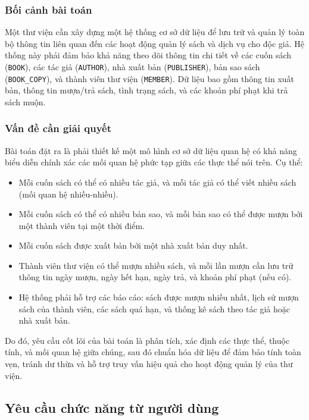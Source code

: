\documentclass[12pt,a4paper]{article}
\newcommand{\entity}[1]{\texttt{#1}}
\begin{document}
\subsubsection{Bối cảnh bài toán}

Một thư viện cần xây dựng một hệ thống cơ sở dữ liệu để lưu trữ và quản lý toàn bộ thông tin liên quan đến các hoạt động quản lý sách và dịch vụ cho độc giả. Hệ thống này phải đảm bảo khả năng theo dõi thông tin chi tiết về các cuốn sách (\entity{BOOK}), các tác giả (\entity{AUTHOR}), nhà xuất bản (\entity{PUBLISHER}), bản sao sách (\entity{BOOK\_COPY}), và thành viên thư viện (\entity{MEMBER}). Dữ liệu bao gồm thông tin xuất bản, thông tin mượn/trả sách, tình trạng sách, và các khoản phí phạt khi trả sách muộn.

\subsubsection{Vấn đề cần giải quyết}

Bài toán đặt ra là phải thiết kế một mô hình cơ sở dữ liệu quan hệ có khả năng biểu diễn chính xác các mối quan hệ phức tạp giữa các thực thể nói trên. Cụ thể:

\begin{itemize}
    \item Mỗi cuốn sách có thể có nhiều tác giả, và mỗi tác giả có thể viết nhiều sách (mối quan hệ nhiều-nhiều).
    \item Mỗi cuốn sách có thể có nhiều bản sao, và mỗi bản sao có thể được mượn bởi một thành viên tại một thời điểm.
    \item Mỗi cuốn sách được xuất bản bởi một nhà xuất bản duy nhất.
    \item Thành viên thư viện có thể mượn nhiều sách, và mỗi lần mượn cần lưu trữ thông tin ngày mượn, ngày hết hạn, ngày trả, và khoản phí phạt (nếu có).
    \item Hệ thống phải hỗ trợ các báo cáo: sách được mượn nhiều nhất, lịch sử mượn sách của thành viên, các sách quá hạn, và thống kê sách theo tác giả hoặc nhà xuất bản.
\end{itemize}

Do đó, yêu cầu cốt lõi của bài toán là phân tích, xác định các thực thể, thuộc tính, và mối quan hệ giữa chúng, sau đó chuẩn hóa dữ liệu để đảm bảo tính toàn vẹn, tránh dư thừa và hỗ trợ truy vấn hiệu quả cho hoạt động quản lý của thư viện.

\subsection{Yêu cầu chức năng từ người dùng}
\end{document}
